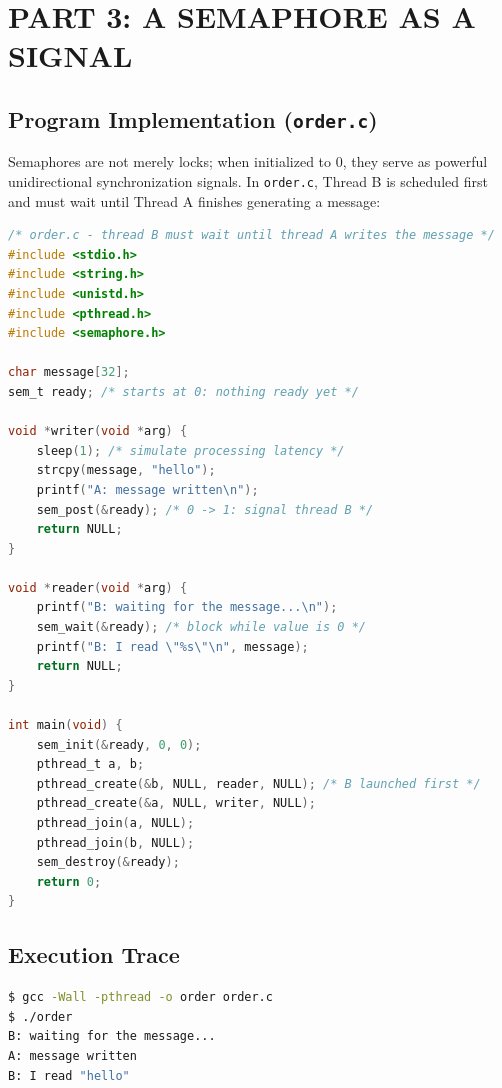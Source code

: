 \documentclass[12pt,a4paper]{report}
\numberwithin{equation}{chapter}
\numberwithin{figure}{chapter}
\numberwithin{table}{chapter}
\begin{document}
\chapter{PART 3: A SEMAPHORE AS A SIGNAL}

\section{Program Implementation (\texttt{order.c})}
Semaphores are not merely locks; when initialized to $0$, they serve as powerful unidirectional synchronization signals. In \texttt{order.c}, Thread B is scheduled first and must wait until Thread A finishes generating a message:

\begin{lstlisting}[language=C]
/* order.c - thread B must wait until thread A writes the message */
#include <stdio.h>
#include <string.h>
#include <unistd.h>
#include <pthread.h>
#include <semaphore.h>

char message[32];
sem_t ready; /* starts at 0: nothing ready yet */

void *writer(void *arg) {
    sleep(1); /* simulate processing latency */
    strcpy(message, "hello");
    printf("A: message written\n");
    sem_post(&ready); /* 0 -> 1: signal thread B */
    return NULL;
}

void *reader(void *arg) {
    printf("B: waiting for the message...\n");
    sem_wait(&ready); /* block while value is 0 */
    printf("B: I read \"%s\"\n", message);
    return NULL;
}

int main(void) {
    sem_init(&ready, 0, 0);
    pthread_t a, b;
    pthread_create(&b, NULL, reader, NULL); /* B launched first */
    pthread_create(&a, NULL, writer, NULL);
    pthread_join(a, NULL);
    pthread_join(b, NULL);
    sem_destroy(&ready);
    return 0;
}
\end{lstlisting}

\section{Execution Trace}
\begin{lstlisting}[language=bash]
$ gcc -Wall -pthread -o order order.c
$ ./order
B: waiting for the message...
A: message written
B: I read "hello"
\end{lstlisting}
\end{document}
